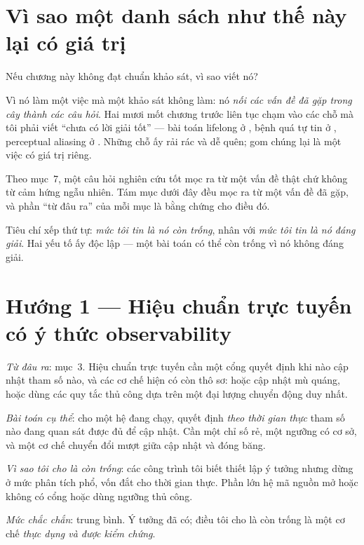 \documentclass[../../vslam.tex]{subfiles}
\begin{document}
\section{Vì sao một danh sách như thế này lại có giá trị}

Nếu chương này không đạt chuẩn khảo sát, vì sao viết nó?

Vì nó làm một việc mà một khảo sát không làm: nó \emph{nối các vấn đề đã gặp trong cây thành các câu hỏi}. Hai mươi mốt chương trước liên tục chạm vào các chỗ mà tôi phải viết ``chưa có lời giải tốt'' --- bài toán lifelong ở , bệnh quá tự tin ở , perceptual aliasing ở . Những chỗ ấy rải rác và dễ quên; gom chúng lại là một việc có giá trị riêng.

Theo  mục~7, một câu hỏi nghiên cứu tốt mọc ra từ một vấn đề thật chứ không từ cảm hứng ngẫu nhiên. Tám mục dưới đây đều mọc ra từ một vấn đề đã gặp, và phần ``từ đâu ra'' của mỗi mục là bằng chứng cho điều đó.

Tiêu chí xếp thứ tự: \emph{mức tôi tin là nó còn trống}, nhân với \emph{mức tôi tin là nó đáng giải}. Hai yếu tố ấy độc lập --- một bài toán có thể còn trống vì nó không đáng giải.

\section{Hướng 1 --- Hiệu chuẩn trực tuyến có ý thức observability}

\emph{Từ đâu ra}:  mục~3. Hiệu chuẩn trực tuyến cần một cổng quyết định khi nào cập nhật tham số nào, và các cơ chế hiện có còn thô sơ: hoặc cập nhật mù quáng, hoặc dùng các quy tắc thủ công dựa trên một đại lượng chuyển động duy nhất.

\emph{Bài toán cụ thể}: cho một hệ đang chạy, quyết định \emph{theo thời gian thực} tham số nào đang quan sát được đủ để cập nhật. Cần một chỉ số rẻ, một ngưỡng có cơ sở, và một cơ chế chuyển đổi mượt giữa cập nhật và đóng băng.

\emph{Vì sao tôi cho là còn trống}: các công trình tôi biết \cite{maye2013selfsupervised,schneider2019observability} thiết lập ý tưởng nhưng dừng ở mức phân tích phổ, vốn đắt cho thời gian thực. Phần lớn hệ mã nguồn mở hoặc không có cổng hoặc dùng ngưỡng thủ công.

\emph{Mức chắc chắn}: trung bình. Ý tưởng đã có; điều tôi cho là còn trống là một cơ chế \emph{thực dụng và được kiểm chứng}.
\end{document}
